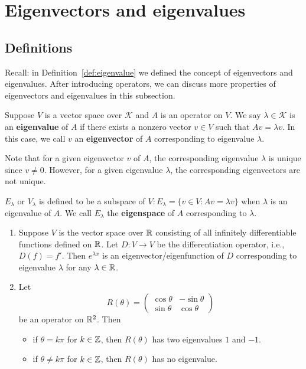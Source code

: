     \chapter{Eigenvectors and eigenvalues}
    \section{Definitions}
    Recall: in Definition~\ref{def:eigenvalue} we defined the concept of eigenvectors and eigenvalues. After introducing operators, we can discuss more properties of eigenvectors and eigenvalues in this subsection.

    \begin{definitionenv}
        Suppose $V$ is a vector space over $\mathcal{K}$ and $A$ is an operator on $V$. We say $\lambda \in \mathcal{K}$ is an \textbf{eigenvalue} of $A$ if there exists a nonzero vector $v\in V$ such that $Av = \lambda v$. In this case, we call $v$ an \textbf{eigenvector} of $A$ corresponding to eigenvalue $\lambda$.
    \end{definitionenv}
    \begin{remarkenv}
        Note that for a given eigenvector $v$ of $A$, the corresponding eigenvalue $\lambda$ is unique since $v\neq 0$. However, for a given eigenvalue $\lambda$, the corresponding eigenvectors are not unique.
    \end{remarkenv}
    \begin{definitionenv}
    $E_\lambda$ or $V_\lambda$ is defined to be a subspace of $V: E_\lambda = \{v\in V: Av = \lambda v\}$ when $\lambda$ is an eigenvalue of $A$. We call $E_\lambda$ the \textbf{eigenspace} of $A$ corresponding to $\lambda$.
    \end{definitionenv}
    \begin{exampleenv}
        \begin{enumerate}
            \item Suppose $V$ is the vector space over $\mathbb{R}$ consisting of all infinitely differentiable functions defined on $\mathbb{R}$. Let $D:V\to V$ be the differentiation operator, i.e., $D(f) = f'$. Then $e^{\lambda x}$ is an eigenvector/eigenfunction of $D$ corresponding to eigenvalue $\lambda$ for any $\lambda \in \mathbb{R}$.
            \item Let
            $$ R(\theta) = \begin{pmatrix}
                \cos \theta & -\sin \theta \\
                \sin \theta & \cos \theta
            \end{pmatrix}
            $$
            be an operator on $\mathbb{R}^2$. Then
            \begin{itemize}
                \item if $\theta = k\pi$ for $k\in \mathbb{Z}$, then $R(\theta)$ has two eigenvalues $1$ and $-1$.
                \item if $\theta \neq k\pi$ for $k\in \mathbb{Z}$, then $R(\theta)$ has no eigenvalue.
            \end{itemize}

        \end{enumerate}
    \end{exampleenv}
